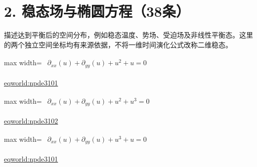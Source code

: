 \documentclass[UTF8,10pt,a4paper,fontset=mac]{ctexart}
\begin{document}
\section*{2. 稳态场与椭圆方程（38条）}
描述达到平衡后的空间分布，例如稳态温度、势场、受迫场及非线性平衡态。这里的两个独立空间坐标均有来源依据，不将一维时间演化公式改称二维稳态。\par\medskip

\begin{minipage}{\linewidth}\begin{center}\begin{adjustbox}{max width=\linewidth}$\displaystyle\begin{gathered}\begin{gathered}\partial_{xx}(u)+\partial_{yy}(u)+u^{2}+u=0\end{gathered}\end{gathered}$\end{adjustbox}\end{center}{\small\href{https://eqworld.ipmnet.ru/en/solutions/npde/npde3101.pdf}{eqworld:npde3101}}\par\end{minipage}\par\vspace{6mm}

\begin{minipage}{\linewidth}\begin{center}\begin{adjustbox}{max width=\linewidth}$\displaystyle\begin{gathered}\begin{gathered}\partial_{xx}(u)+\partial_{yy}(u)+u^{2}+u^{3}=0\end{gathered}\end{gathered}$\end{adjustbox}\end{center}{\small\href{https://eqworld.ipmnet.ru/en/solutions/npde/npde3102.pdf}{eqworld:npde3102}}\par\end{minipage}\par\vspace{6mm}

\begin{minipage}{\linewidth}\begin{center}\begin{adjustbox}{max width=\linewidth}$\displaystyle\begin{gathered}\begin{gathered}\partial_{xx}(u)+\partial_{yy}(u)+u^{3}+u=0\end{gathered}\end{gathered}$\end{adjustbox}\end{center}{\small\href{https://eqworld.ipmnet.ru/en/solutions/npde/npde3101.pdf}{eqworld:npde3101}}\par\end{minipage}\par\vspace{6mm}
\end{document}
